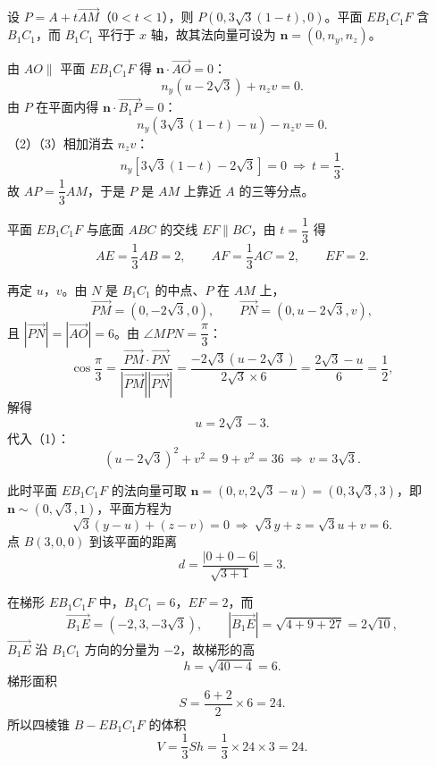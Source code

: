 \begin{answer}
设 $P=A+t\overrightarrow{AM}$（$0<t<1$），则 $P\left(0,3\sqrt3(1-t),0\right)$。平面 $EB_1C_1F$ 含 $B_1C_1$，而 $B_1C_1$ 平行于 $x$ 轴，故其法向量可设为 $\boldsymbol n=(0,n_y,n_z)$。

由 $AO\parallel$ 平面 $EB_1C_1F$ 得 $\boldsymbol n\cdot\overrightarrow{AO}=0$：
\nopagebreak[4]
\[n_y\left(u-2\sqrt3\right)+n_zv=0. \tag{2}\]
由 $P$ 在平面内得 $\boldsymbol n\cdot\overrightarrow{B_1P}=0$：
\nopagebreak[4]
\[n_y\left(3\sqrt3(1-t)-u\right)-n_zv=0. \tag{3}\]
（2）（3）相加消去 $n_zv$：
\nopagebreak[4]
\[n_y\left[3\sqrt3(1-t)-2\sqrt3\right]=0\ \Longrightarrow\ t=\frac13 .\]
故 $AP=\dfrac13AM$，于是 $P$ 是 $AM$ 上靠近 $A$ 的三等分点。

平面 $EB_1C_1F$ 与底面 $ABC$ 的交线 $EF\parallel BC$，由 $t=\dfrac13$ 得
\nopagebreak[4]
\[AE=\frac13AB=2,\qquad AF=\frac13AC=2,\qquad EF=2 .\]

再定 $u$，$v$。由 $N$ 是 $B_1C_1$ 的中点、$P$ 在 $AM$ 上，
\nopagebreak[4]
\[\overrightarrow{PM}=\left(0,-2\sqrt3,0\right),\qquad \overrightarrow{PN}=\left(0,u-2\sqrt3,v\right),\]
且 $|\overrightarrow{PN}|=|\overrightarrow{AO}|=6$。由 $\angle MPN=\dfrac\pi3$：
\nopagebreak[4]
\[\cos\frac\pi3=\frac{\overrightarrow{PM}\cdot\overrightarrow{PN}}{|\overrightarrow{PM}||\overrightarrow{PN}|}
=\frac{-2\sqrt3\left(u-2\sqrt3\right)}{2\sqrt3\times6}=\frac{2\sqrt3-u}{6}=\frac12,\]
解得
\nopagebreak[4]
\[u=2\sqrt3-3 .\]
代入（1）：
\nopagebreak[4]
\[\left(u-2\sqrt3\right)^2+v^2=9+v^2=36\ \Longrightarrow\ v=3\sqrt3 .\]

此时平面 $EB_1C_1F$ 的法向量可取 $\boldsymbol n=(0,v,2\sqrt3-u)=(0,3\sqrt3,3)$，即 $\boldsymbol n\sim(0,\sqrt3,1)$，平面方程为
\nopagebreak[4]
\[\sqrt3\left(y-u\right)+\left(z-v\right)=0\ \Longrightarrow\ \sqrt3y+z=\sqrt3u+v=6 .\]
点 $B(3,0,0)$ 到该平面的距离
\nopagebreak[4]
\[d=\frac{|0+0-6|}{\sqrt{3+1}}=3 .\]

在梯形 $EB_1C_1F$ 中，$B_1C_1=6$，$EF=2$，而
\nopagebreak[4]
\[\overrightarrow{B_1E}=\left(-2,3,-3\sqrt3\right),\qquad \left|\overrightarrow{B_1E}\right|=\sqrt{4+9+27}=2\sqrt{10},\]
$\overrightarrow{B_1E}$ 沿 $B_1C_1$ 方向的分量为 $-2$，故梯形的高
\nopagebreak[4]
\[h=\sqrt{40-4}=6 .\]
梯形面积
\nopagebreak[4]
\[S=\frac{6+2}2\times6=24 .\]
所以四棱锥 $B-EB_1C_1F$ 的体积
\nopagebreak[4]
\[V=\frac13Sh=\frac13\times24\times3=24 .\]



\end{answer}
